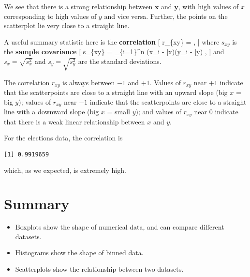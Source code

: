 \documentclass[
  letterpaper,
  DIV=11,
  numbers=noendperiod]{scrreprt}
\newenvironment{Shaded}{\begin{snugshade}}{\end{snugshade}}
\newcommand{\FunctionTok}[1]{\textcolor[rgb]{0.28,0.35,0.67}{#1}}
\newcommand{\NormalTok}[1]{\textcolor[rgb]{0.00,0.23,0.31}{#1}}
\newcommand{\SpecialCharTok}[1]{\textcolor[rgb]{0.37,0.37,0.37}{#1}}
\providecommand{\tightlist}{%
  \setlength{\itemsep}{0pt}\setlength{\parskip}{0pt}}\usepackage{longtable,booktabs,array}
\theoremstyle{remark}
\begin{document}
We see that there is a strong relationship between \(\mathbf x\) and
\(\mathbf y\), with high values of \(x\) corresponding to high values of
\(y\) and vice versa. Further, the points on the scatterplot lie very
close to a straight line.

A useful summary statistic here is the \textbf{correlation} {[}
r\_\{xy\} =  , {]} where \(s_{xy}\) is the
\textbf{sample covariance} {[} s\_\{xy\} = 
\sum\_\{i=1\}\^{}n (x\_i - \bar x)(y\_i - \bar y) , {]} and
\(s_x = \sqrt{s_x^2}\) and \(s_y = \sqrt{s_y^2}\) are the standard
deviations.

The correlation \(r_{xy}\) is always between \(-1\) and \(+1\). Values
of \(r_{xy}\) near \(+1\) indicate that the scatterpoints are close to a
straight line with an upward slope (big \(x\) = big \(y\)); values of
\(r_{xy}\) near \(-1\) indicate that the scatterpoints are close to a
straight line with a downward slope (big \(x\) = small \(y\)); and
values of \(r_{xy}\) near 0 indicate that there is a weak linear
relationship between \(x\) and \(y\).

For the elections data, the correlation is

\begin{Shaded}
\end{Shaded}

\begin{verbatim}
[1] 0.9919659
\end{verbatim}

which, as we expected, is extremely high.

\hypertarget{summary-02}{%
\section*{Summary}\label{summary-02}}


\begin{itemize}
\tightlist
\item
  Boxplots show the shape of numerical data, and can compare different
  datasets.
\item
  Histograms show the shape of binned data.
\item
  Scatterplots show the relationship between two datasets.
\end{itemize}
\end{document}
